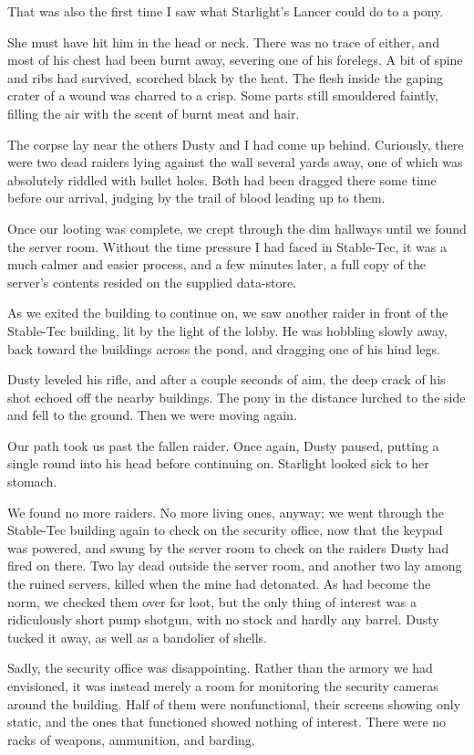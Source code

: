 That was also the first time I saw what Starlight’s Lancer could do to a pony.

She must have hit him in the head or neck. There was no trace of either, and most of his chest had been burnt away, severing one of his forelegs. A bit of spine and ribs had survived, scorched black by the heat. The flesh inside the gaping crater of a wound was charred to a crisp. Some parts still smouldered faintly, filling the air with the scent of burnt meat and hair.

The corpse lay near the others Dusty and I had come up behind. Curiously, there were two dead raiders lying against the wall several yards away, one of which was absolutely riddled with bullet holes. Both had been dragged there some time before our arrival, judging by the trail of blood leading up to them.

Once our looting was complete, we crept through the dim hallways until we found the server room. Without the time pressure I had faced in Stable-Tec, it was a much calmer and easier process, and a few minutes later, a full copy of the server’s contents resided on the supplied data-store.

As we exited the building to continue on, we saw another raider in front of the Stable-Tec building, lit by the light of the lobby. He was hobbling slowly away, back toward the buildings across the pond, and dragging one of his hind legs.

Dusty leveled his rifle, and after a couple seconds of aim, the deep crack of his shot echoed off the nearby buildings. The pony in the distance lurched to the side and fell to the ground. Then we were moving again.

Our path took us past the fallen raider. Once again, Dusty paused, putting a single round into his head before continuing on. Starlight looked sick to her stomach.

We found no more raiders. No more living ones, anyway; we went through the Stable-Tec building again to check on the security office, now that the keypad was powered, and swung by the server room to check on the raiders Dusty had fired on there. Two lay dead outside the server room, and another two lay among the ruined servers, killed when the mine had detonated. As had become the norm, we checked them over for loot, but the only thing of interest was a ridiculously short pump shotgun, with no stock and hardly any barrel. Dusty tucked it away, as well as a bandolier of shells.

Sadly, the security office was disappointing. Rather than the armory we had envisioned, it was instead merely a room for monitoring the security cameras around the building. Half of them were nonfunctional, their screens showing only static, and the ones that functioned showed nothing of interest. There were no racks of weapons, ammunition, and barding.

